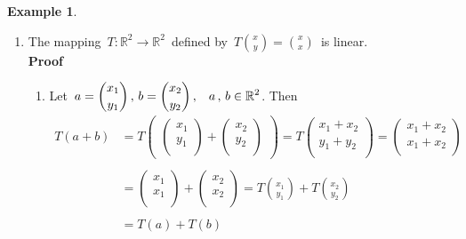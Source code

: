 \documentclass[11pt,a4paper]{article}
\theoremstyle{definition}
\newtheorem{exa}[thm]{Example}
\begin{document}
\begin{exa}
\begin{enumerate}
\item The mapping $\, T: \mathbb{R}^2 \longrightarrow \mathbb{R}^2\,$ defined by $\, \displaystyle{T \binom{x}{y} = \binom{x}{x}}\,$ is linear.\\

\textbf{Proof}
\begin{enumerate}
\item[(i)] Let $\, \displaystyle{a = \binom{x_1}{y_1}\, , \, b = \binom{x_2}{y_2}\, , \hspace{0.3cm} a\, , \, b \in \mathbb{R}^2}$. Then
\begin{align*}
T(a + b) & = T\begin{pmatrix}
\begin{pmatrix}
x_1\\
y_1\\
\end{pmatrix} + \begin{pmatrix}
x_2\\
y_2\\
\end{pmatrix}
\end{pmatrix} = T \begin{pmatrix}
x_1 + x_2\\
y_1 + y_2\\
\end{pmatrix} = \begin{pmatrix}
x_1 + x_2\\
x_1 + x_2\\
\end{pmatrix}\\\\
& = \begin{pmatrix}
x_1\\
x_1\\
\end{pmatrix} + \begin{pmatrix}
x_2\\
x_2\\
\end{pmatrix} = T\binom{x_1}{y_1} + T\binom{x_2}{y_2}\\\\
& = T(a) + T(b)
\end{align*} 


\end{enumerate}
\end{enumerate}
\end{exa}
\end{document}
